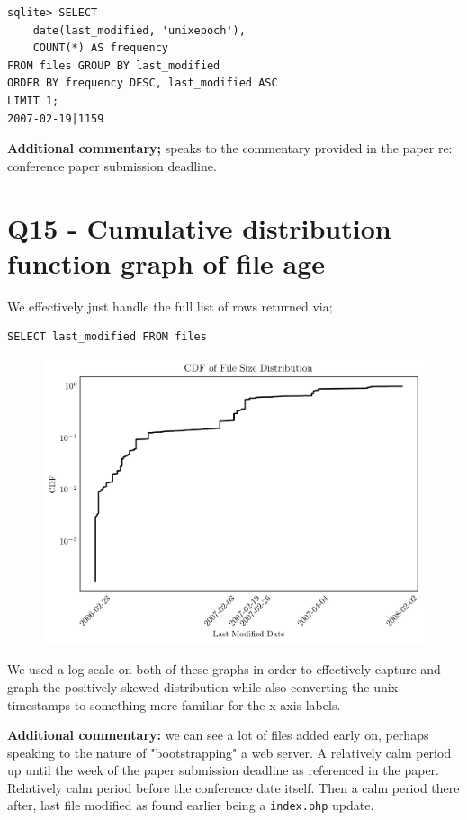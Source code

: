 \documentclass{article}
\begin{document}
\begin{verbatim}
sqlite> SELECT
    date(last_modified, 'unixepoch'),
    COUNT(*) AS frequency
FROM files GROUP BY last_modified   
ORDER BY frequency DESC, last_modified ASC
LIMIT 1;
2007-02-19|1159
\end{verbatim}

\textbf{Additional commentary;} speaks to the commentary provided in the paper re: conference paper submission deadline.

\newpage

\section*{Q15 - Cumulative distribution function graph of file age}
We effectively just handle the full list of rows returned via;

\begin{small}
\begin{verbatim}
SELECT last_modified FROM files
\end{verbatim}
\end{small}

\begin{figure}[htbp]
\centering
\includegraphics[width=\linewidth]{./images/last_modified_size_cdf.png}
\end{figure}

We used a log scale on both of these graphs in order to effectively capture and graph the positively-skewed distribution while also converting the unix timestamps to something more familiar for the x-axis labels.

\textbf{Additional commentary:} we can see a lot of files added early on, perhaps speaking to the nature of "bootstrapping" a web server. A relatively calm period up until the week of the paper submission deadline as referenced in the paper. Relatively calm period before the conference date itself. Then a calm period there after, last file modified as found earlier being a \texttt{index.php} update.

\newpage
\printbibliography
\end{document}
